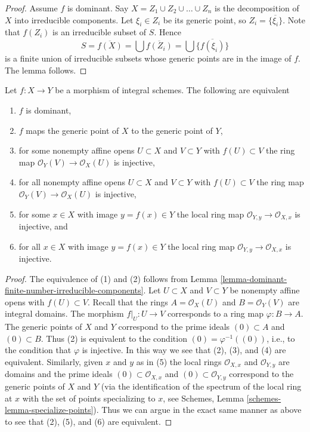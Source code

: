 \begin{proof}
Assume $f$ is dominant.
Say $X = Z_1 \cup Z_2 \cup \ldots \cup Z_n$ is the decomposition
of $X$ into irreducible components. Let $\xi_i \in Z_i$ be
its generic point, so $Z_i = \overline{\{\xi_i\}}$.
Note that $f(Z_i)$ is an irreducible subset of $S$.
Hence
$$
S = \overline{f(X)} = \bigcup \overline{f(Z_i)} =
\bigcup \overline{\{f(\xi_i)\}}
$$
is a finite union of irreducible subsets whose generic
points are in the image of $f$. The lemma follows.
\end{proof}

\begin{lemma}
\label{lemma-dominant-between-integral}
Let $f : X \to Y$ be a morphism of integral schemes. The following
are equivalent
\begin{enumerate}
\item $f$ is dominant,
\item $f$ maps the generic point of $X$ to the generic point of $Y$,
\item for some nonempty affine opens $U \subset X$ and $V \subset Y$
with $f(U) \subset V$ the ring map $\mathcal{O}_Y(V) \to \mathcal{O}_X(U)$
is injective,
\item for all nonempty affine opens $U \subset X$ and $V \subset Y$
with $f(U) \subset V$ the ring map $\mathcal{O}_Y(V) \to \mathcal{O}_X(U)$
is injective,
\item for some $x \in X$ with image $y = f(x) \in Y$ the local ring
map $\mathcal{O}_{Y, y} \to \mathcal{O}_{X, x}$ is injective, and
\item for all $x \in X$ with image $y = f(x) \in Y$ the local ring
map $\mathcal{O}_{Y, y} \to \mathcal{O}_{X, x}$ is injective.
\end{enumerate}
\end{lemma}

\begin{proof}
The equivalence of (1) and (2) follows from
Lemma \ref{lemma-dominant-finite-number-irreducible-components}.
Let $U \subset X$ and $V \subset Y$ be nonempty affine opens with
$f(U) \subset V$. Recall that the rings $A = \mathcal{O}_X(U)$
and $B = \mathcal{O}_Y(V)$ are integral domains.
The morphism $f|_U : U \to V$ corresponds to a ring map
$\varphi : B \to A$. The generic points of $X$ and $Y$ correspond
to the prime ideals $(0) \subset A$ and $(0) \subset B$. Thus
(2) is equivalent to the condition $(0) = \varphi^{-1}((0))$,
i.e., to the condition that $\varphi$ is injective.
In this way we see that (2), (3), and (4) are equivalent.
Similarly, given $x$ and $y$ as in (5) the local rings
$\mathcal{O}_{X, x}$ and $\mathcal{O}_{Y, y}$ are domains
and the prime ideals $(0) \subset \mathcal{O}_{X, x}$
and $(0) \subset \mathcal{O}_{Y, y}$ correspond to the
generic points of $X$ and $Y$ (via the identification of
the spectrum of the local ring at $x$
with the set of points specializing to $x$, see
Schemes, Lemma \ref{schemes-lemma-specialize-points}).
Thus we can argue in the exact same manner as above
to see that (2), (5), and (6) are equivalent.
\end{proof}







